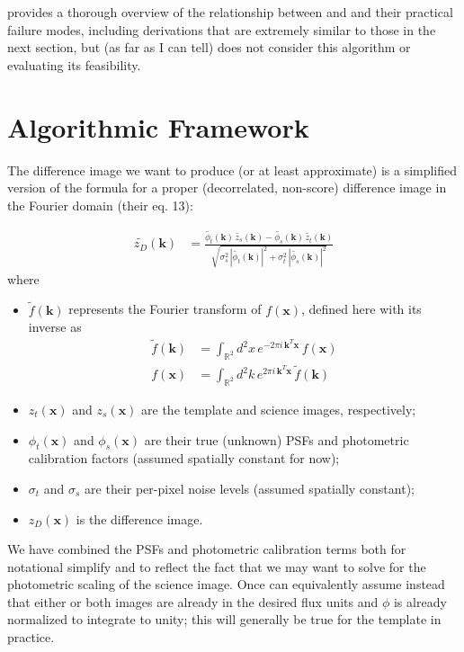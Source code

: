 \documentclass[DM,authoryear,toc]{lsstdoc}
\newcommand{\ZOGY}{\citetalias{2016ApJ...830...27Z}}
\newcommand{\AL}{\citetalias{1998ApJ...503..325A}}
\begin{document}
 provides a thorough overview of the relationship between \ZOGY{} and \AL{} and their practical failure modes, including derivations that are extremely similar to those in the next section, but (as far as I can tell) does not consider this algorithm or evaluating its feasibility.

\section{Algorithmic Framework}

The difference image we want to produce (or at least approximate) is a simplified version of the \ZOGY{} formula for a proper (decorrelated, non-score) difference image in the Fourier domain (their eq. 13):

\begin{align}
  \widetilde{z_D}(\symbf{k}) & = \frac{
    \widetilde{\phi_t}(\symbf{k}) \, \widetilde{z_s}(\symbf{k})
    - \widetilde{\phi_s}(\symbf{k}) \, \widetilde{z_t}(\symbf{k})
  }{
    \sqrt{
      \sigma_s^2 \, \left|\widetilde{\phi_t}(\symbf{k})\right|^2
      + \sigma_t^2 \, \left|\widetilde{\phi_s}(\symbf{k})\right|^2
    }
  }
  \label{eqn:zogy-diffim}
\end{align}
where
\begin{itemize}
  \item $\widetilde{f}(\symbf{k})$ represents the Fourier transform of $f(\symbf{x})$, defined here with its inverse as
  \begin{align}
    \widetilde{f}(\symbf{k}) &= \int_{\mathbb{R}^2} d^2 x \, e^{-2\pi i \, \symbf{k}^T\!\symbf{x}} \, f(\symbf{x}) \\
    f(\symbf{x}) &= \int_{\mathbb{R}^2} d^2 k \, e^{2\pi i \, \symbf{k}^T\!\symbf{x}} \, \widetilde{f}(\symbf{k})
  \end{align}
  \item $z_t(\symbf{x})$ and $z_s(\symbf{x})$ are the template and science images, respectively;
  \item $\phi_t(\symbf{x})$ and $\phi_s(\symbf{x})$ are their true (unknown) PSFs and photometric calibration factors (assumed spatially constant for now);
  \item $\sigma_t$ and $\sigma_s$ are their per-pixel noise levels (assumed spatially constant);
  \item $z_D(\symbf{x})$ is the difference image.
\end{itemize}
We have combined the PSFs and photometric calibration terms both for notational simplify and to reflect the fact that we may want to solve for the photometric scaling of the science image.
Once can equivalently assume instead that either or both images are already in the desired flux units and $\phi$ is already normalized to integrate to unity; this will generally be true for the template in practice.
\end{document}
